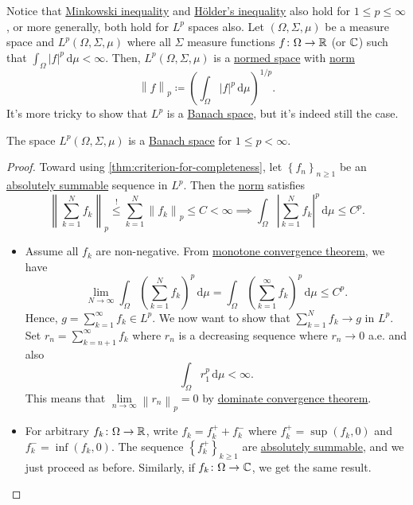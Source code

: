 Notice that \hyperref[lma:Minkowski-ineq]{Minkowski inequality} and \hyperref[lma:Holder-ineq]{Hölder's inequality} also hold for \(1 \leq p \leq \infty \), or more generally, both hold for \(L^p\) spaces also. Let \((\Omega , \Sigma , \mu )\) be a measure space and \(L^p(\Omega , \Sigma , \mu )\) where all \(\Sigma \) measure functions \(f\colon \Omega \to \mathbb{\MakeUppercase{r}} \) (or \(\mathbb{\MakeUppercase{c}} \)) such that \(\int _\Omega \left\vert f \right\vert ^p \,\mathrm{d} \mu < \infty \). Then, \(L^p(\Omega , \Sigma , \mu )\) is a \hyperref[def:normed-vector-space]{normed space} with \hyperref[def:norm]{norm}
\[
	\left\lVert f\right\rVert _p \coloneqq \left( \int _\Omega \left\vert f \right\vert ^p \,\mathrm{d} \mu  \right) ^{1 / p}.
\]
It's more tricky to show that \(L^p\) is a \hyperref[def:Banach-space]{Banach space}, but it's indeed still the case.

\begin{theorem}
	The space \(L^p(\Omega , \Sigma , \mu )\) is a \hyperref[def:Banach-space]{Banach space} for \(1 \leq p < \infty \).
\end{theorem}
\begin{proof}
	Toward using \autoref{thm:criterion-for-completeness}, let \(\left\{ f_n \right\}_{n\geq 1} \) be an \hyperref[def:absolutely-summable]{absolutely summable} sequence in \(L^p\). Then the \hyperref[def:norm]{norm} satisfies
	\[
		\left\lVert \sum_{k=1}^{N} f_k\right\rVert _p \overset{\hyperref[lma:Minkowski-ineq]{\text{!}}}{\leq} \sum_{k=1}^{N} \left\lVert f_k\right\rVert _p \leq C < \infty \implies \int _\Omega \left\vert \sum_{k=1}^{N} f_k \right\vert^p \,\mathrm{d} \mu  \leq C^p.
	\]
	\begin{itemize}
		\item Assume all \(f_k\) are non-negative. From \href{https://en.wikipedia.org/wiki/Monotone_convergence_theorem}{monotone convergence theorem}, we have
		      \[
			      \lim\limits_{N \to \infty} \int _\Omega \left( \sum_{k=1}^{N} f_k \right) ^p \,\mathrm{d} \mu = \int _\Omega \left( \sum_{k=1}^{\infty} f_k \right)^p \,\mathrm{d} \mu \leq C^p.
		      \]
		      Hence, \(g = \sum_{k=1}^{\infty} f_k\in L^p\). We now want to show that \(\sum_{k=1}^{N} f_k \to g\) in \(L^p\). Set \(r_n = \sum_{k=n+1}^{\infty} f_k\) where \(r_n\) is a decreasing sequence where \(r_n \to 0\) a.e. and also
		      \[
			      \int _\Omega r_1^p\,\mathrm{d} \mu < \infty.
		      \]
		      This means that \(\lim\limits_{n \to \infty} \left\lVert r_n\right\rVert _p = 0\) by \href{https://en.wikipedia.org/wiki/Dominated_convergence_theorem}{dominate convergence theorem}.
		\item For arbitrary \(f_k\colon \Omega \to \mathbb{\MakeUppercase{r}} \), write \(f_k = f^+_k + f^-_k\) where \(f^+_k = \sup (f_k, 0)\) and \(f_k^- = \inf (f_k, 0)\). The sequence \(\left\{ f_k^+ \right\}_{k\geq 1} \) are \hyperref[def:absolutely-summable]{absolutely summable}, and we just proceed as before. Similarly, if \(f_k\colon \Omega \to \mathbb{\MakeUppercase{c}} \), we get the same result.
	\end{itemize}
\end{proof}


